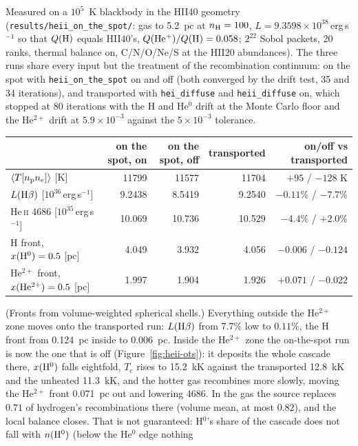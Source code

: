 \documentclass[english,a4paper]{my_memo}
\newcommand{\code}[1]{\texttt{#1}}
\begin{document}
Measured on a $10^5$~K blackbody in the HII40 geometry
(\code{results/heii\_on\_the\_spot/}: gas to 5.2~pc at $n_{\rm H}=100$,
$L=9.3598\times10^{38}$\,erg\,s$^{-1}$ so that $Q({\rm H})$ equals HII40's,
$Q({\rm He^+})/Q({\rm H})=0.058$; $2^{22}$ Sobol packets, 20 ranks, thermal
balance on, C/N/O/Ne/S at the HII20 abundances).  The three runs share every
input but the treatment of the recombination continuum: on the spot with
\code{heii\_on\_the\_spot} on and off (both converged by the drift test, 35
and 34 iterations), and transported with \code{hei\_diffuse} and
\code{heii\_diffuse} on, which stopped at 80 iterations with the H and
He$^0$ drift at the Monte Carlo floor and the He$^{2+}$ drift at
$5.9\times10^{-3}$ against the $5\times10^{-3}$ tolerance.
\begin{center}
\begin{tabular}{lrrrr}
\toprule
 & on the spot, on & on the spot, off & transported & on/off vs transported \\
\midrule
$\langle T[n_{\rm p}n_e]\rangle$ [K] & 11799 & 11577 & 11704 & $+95$ / $-128$ K \\
$L({\rm H}\beta)$ [$10^{36}$\,erg\,s$^{-1}$] & 9.2438 & 8.5419 & 9.2540 & $-0.11\%$ / $-7.7\%$ \\
He\,\textsc{ii} 4686 [$10^{35}$\,erg\,s$^{-1}$] & 10.069 & 10.736 & 10.529 & $-4.4\%$ / $+2.0\%$ \\
H front, $x({\rm H^0})=0.5$ [pc] & 4.049 & 3.932 & 4.056 & $-0.006$ / $-0.124$ \\
He$^{2+}$ front, $x({\rm He^{2+}})=0.5$ [pc] & 1.997 & 1.904 & 1.926 & $+0.071$ / $-0.022$ \\
\bottomrule
\end{tabular}
\end{center}
(Fronts from volume-weighted spherical shells.)  Everything outside the
He$^{2+}$ zone moves onto the transported run: $L({\rm H}\beta)$ from $7.7\%$
low to $0.11\%$, the H front from 0.124~pc inside to 0.006~pc.  Inside the
He$^{2+}$ zone the on-the-spot run is now the one that is off
(Figure~\ref{fig:heii-ots}): it deposits the whole cascade there, $x({\rm H^0})$
falls eightfold, $T_e$ rises to 15.2~kK against the transported 12.8~kK and
the unheated 11.3~kK, and the hotter gas recombines more slowly, moving the
He$^{2+}$ front 0.071~pc out and lowering 4686.  In the gas the source
replaces $0.71$ of hydrogen's recombinations there (volume mean, at most
$0.82$), and the local balance closes.  That is not guaranteed: H$^0$'s share
of the cascade does not fall with $n({\rm H^0})$ (below the He$^0$ edge nothing
\end{document}
